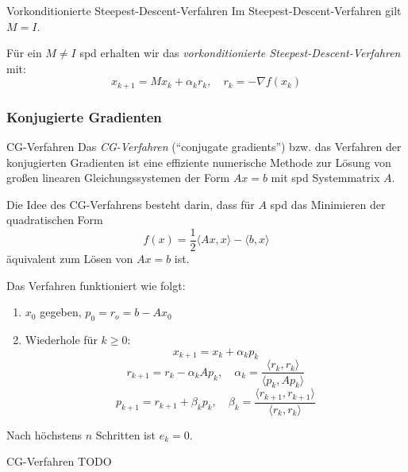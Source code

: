 \begin{bonus}{Vorkonditionierte Steepest-Descent-Verfahren}
    Im Steepest-Descent-Verfahren gilt $M = I$.

    Für ein $M \neq I$ spd erhalten wir das \emph{vorkonditionierte Steepest-Descent-Verfahren} mit:
    \[
        x_{k+1} = M x_k + \alpha_k r_k, \quad r_k = - \nabla f(x_k)
    \]
\end{bonus}

\subsubsection{Konjugierte Gradienten}

\begin{defi}{CG-Verfahren}
    Das \emph{CG-Verfahren} (\enquote{conjugate gradients}) bzw. das Verfahren der konjugierten Gradienten ist eine effiziente numerische Methode zur Lösung von großen linearen Gleichungssystemen der Form $A x = b$ mit spd Systemmatrix $A$.

    Die Idee des CG-Verfahrens besteht darin, dass für $A$ spd das Minimieren der quadratischen Form
    \[
        f(x) = \frac{1}{2} \langle Ax, x \rangle - \langle b, x \rangle
    \]
    äquivalent zum Lösen von $A x = b$ ist.

    Das Verfahren funktioniert wie folgt:
    \begin{enumerate}
        \item $x_0$ gegeben, $p_0 = r_o = b - Ax_0$
        \item Wiederhole für $k \geq 0$:
              \[ x_{k+1} = x_k + \alpha_k p_k \]
              \[ r_{k+1} = r_k - \alpha_k A p_k, \quad \alpha_k = \frac{\langle r_k, r_k \rangle}{\langle p_k, A p_k \rangle} \]
              \[ p_{k+1} = r_{k+1} + \beta_k p_k, \quad \beta_k = \frac{\langle r_{k+1}, r_{k+1} \rangle}{\langle r_k, r_k \rangle}\]
    \end{enumerate}

    Nach höchstens $n$ Schritten ist $e_k = 0$.
\end{defi}

\begin{example}{CG-Verfahren}
    TODO
\end{example}

